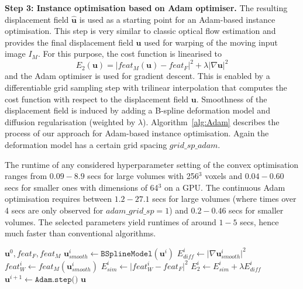 \noindent \textbf{Step 3: Instance optimisation based on Adam optimiser.} 
The resulting displacement field $\mathbf{\hat{u}}$ is used as a starting point for an Adam-based instance optimisation. This step is very similar to classic optical flow estimation \citep{papenberg2006highly} and provides the final displacement field $\mathbf{u}$ used for warping of the moving input image $I_M$. For this purpose, the cost function is linearised to
\begin{equation}\label{adamloss}
E_{2}(\mathbf{u})= \vert feat_M(\mathbf{u}) - feat_F \vert^2 +\lambda\vert\nabla\mathbf{u}\vert^2
\end{equation}
and the Adam optimiser \citep{kingma2014adam} is used for gradient descent. This is enabled by a differentiable grid sampling step with trilinear interpolation that computes the cost function with respect to the displacement field $\mathbf{u}$. Smoothness of the displacement field is induced by adding a B-spline deformation model and diffusion regularisation (weighted by $\lambda$). Algorithm~\ref{alg:Adam} describes the process of our approach for Adam-based instance optimisation. Again the deformation model has a certain grid spacing $grid\_sp\_adam$. 

The runtime of any considered hyperparameter setting of the convex optimisation ranges from $0.09-8.9$ secs for large volumes with 256$^3$ voxels and $0.04-0.60$ secs for smaller ones with dimensions of 64$^3$ on a GPU. The continuous Adam optimisation requires between $1.2-27.1$ secs for large volumes (where times over 4 secs are only observed for $adam\_grid\_sp=1$) and $0.2-0.46$ secs for smaller volumes. The selected parameters yield runtimes of around $1-5$ secs, hence much faster than conventional algorithms. 

\begin{algorithm}
\caption{Adam-based instance optimisation}\label{alg:Adam}
\begin{algorithmic}[1]
\State\scriptsize$\mathbf{u}^{0}, feat_F, feat_M$
\scriptsize 
{}
\State\scriptsize $\mathbf{u}^{i}_{smooth} \gets \texttt{BSplineModel}(\mathbf{u}^{i})$ 
\State\scriptsize $E^{i}_{diff} \gets  \vert\nabla\mathbf{u}^{i}_{smooth}\vert^2$ 
\State\scriptsize $feat^{i}_W \gets feat_M(\mathbf{u}^{i}_{smooth})$ 
\State\scriptsize $E^{i}_{sim} \gets \vert feat^{i}_W - feat_F\vert^2$ 
\State\scriptsize $E^{i}_{2} \gets E^{i}_{sim}+ \lambda E^{i}_{diff}$ 
\State\scriptsize $\mathbf{u}^{i+1} \gets \texttt{Adam.step()}$
\scriptsize\EndFor
\State\scriptsize$\mathbf{u}$

\end{algorithmic}
\end{algorithm}


